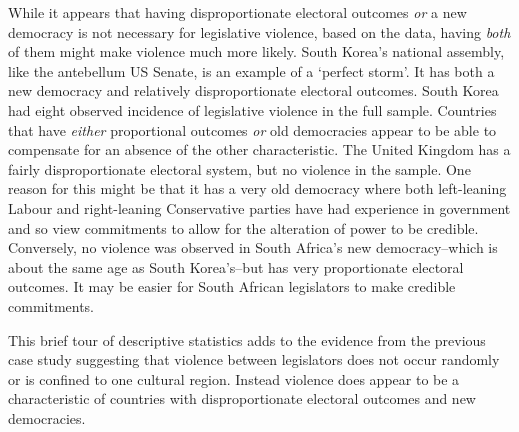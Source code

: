 \documentclass[a4paper]{article}\usepackage[]{graphicx}\usepackage[]{color}
\begin{document}
While it appears that having disproportionate electoral outcomes \emph{or} a new democracy is not necessary for legislative violence, based on the data, having \emph{both} of them might make violence much more likely. South Korea's national assembly, like the antebellum US Senate, is an example of a `perfect storm'. It has both a new democracy and relatively disproportionate electoral outcomes. South Korea had eight observed incidence of legislative violence in the full sample. Countries that have \emph{either} proportional outcomes \emph{or} old democracies appear to be able to compensate for an absence of the other characteristic. The United Kingdom has a fairly disproportionate electoral system, but no violence in the sample. One reason for this might be that it has a very old democracy where both left-leaning Labour and right-leaning Conservative parties have had experience in government and so view commitments to allow for the alteration of power to be credible.  Conversely, no violence was observed in South Africa's new democracy--which is about the same age as South Korea's--but has very proportionate electoral outcomes. It may be easier for South African legislators to make credible commitments.

This brief tour of descriptive statistics adds to the evidence from the previous case study suggesting that violence between legislators does not occur randomly or is confined to one cultural region. Instead violence does appear to be a characteristic of countries with disproportionate electoral outcomes and new democracies.
\end{document}

